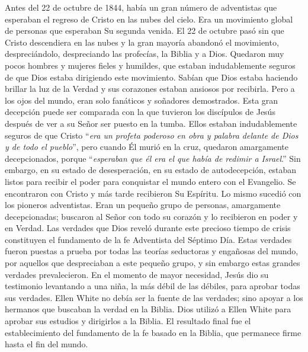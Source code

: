 Antes del 22 de octubre de 1844, había un gran número de adventistas que esperaban el regreso de Cristo en las nubes del cielo. Era un movimiento global de personas que esperaban Su segunda venida. El 22 de octubre pasó sin que Cristo descendiera en las nubes y la gran mayoría abandonó el movimiento, despreciándolo, despreciando las profecías, la Biblia y a Dios. Quedaron muy pocos hombres y mujeres fieles y humildes, que estaban indudablemente seguros de que Dios estaba dirigiendo este movimiento. Sabían que Dios estaba haciendo brillar la luz de la Verdad y sus corazones estaban ansiosos por recibirla. Pero a los ojos del mundo, eran solo fanáticos y soñadores demostrados. Esta gran decepción puede ser comparada con la que tuvieron los discípulos de Jesús después de ver a su Señor ser puesto en la tumba. Ellos estaban indudablemente seguros de que Cristo “\textit{era un profeta poderoso en obra y palabra delante de Dios y de todo el pueblo}”, pero cuando Él murió en la cruz, quedaron amargamente decepcionados, porque “\textit{esperaban que él era el que había de redimir a Israel}.” Sin embargo, en su estado de desesperación, en su estado de autodecepción, estaban listos para recibir el poder para conquistar el mundo entero con el Evangelio. Se encontraron con Cristo y más tarde recibieron Su Espíritu. Lo mismo sucedió con los pioneros adventistas. Eran un pequeño grupo de personas, amargamente decepcionadas; buscaron al Señor con todo su corazón y lo recibieron en poder y en Verdad. Las verdades que Dios reveló durante este precioso tiempo de crisis constituyen el fundamento de la fe Adventista del Séptimo Día. Estas verdades fueron puestas a prueba por todas las teorías seductoras y engañosas del mundo, por aquellos que despreciaban a este pequeño grupo, y sin embargo estas grandes verdades prevalecieron. En el momento de mayor necesidad, Jesús dio su testimonio levantando a una niña, la más débil de las débiles, para aprobar todas sus verdades. Ellen White no debía ser la fuente de las verdades; sino apoyar a los hermanos que buscaban la verdad en la Biblia. Dios utilizó a Ellen White para aprobar sus estudios y dirigirlos a la Biblia. El resultado final fue el establecimiento del fundamento de la fe basado en la Biblia, que permanece firme hasta el fin del mundo.


